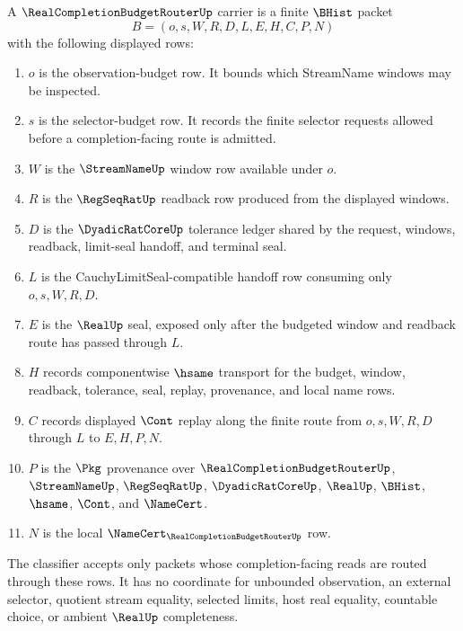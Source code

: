 \begin{definition}
\label{def:real-completion-budget-router-carrier}
A $\RealCompletionBudgetRouterUp$ carrier is a finite $\BHist$ packet
$$
B=(o,s,W,R,D,L,E,H,C,P,N)
$$
with the following displayed rows:
\begin{enumerate}
\item $o$ is the observation-budget row. It bounds which StreamName windows may be inspected.
\item $s$ is the selector-budget row. It records the finite selector requests allowed before a completion-facing route is admitted.
\item $W$ is the $\StreamNameUp$ window row available under $o$.
\item $R$ is the $\RegSeqRatUp$ readback row produced from the displayed windows.
\item $D$ is the $\DyadicRatCoreUp$ tolerance ledger shared by the request, windows, readback, limit-seal handoff, and terminal seal.
\item $L$ is the CauchyLimitSeal-compatible handoff row consuming only $o,s,W,R,D$.
\item $E$ is the $\RealUp$ seal, exposed only after the budgeted window and readback route has passed through $L$.
\item $H$ records componentwise $\hsame$ transport for the budget, window, readback, tolerance, seal, replay, provenance, and local name rows.
\item $C$ records displayed $\Cont$ replay along the finite route from $o,s,W,R,D$ through $L$ to $E,H,P,N$.
\item $P$ is the $\Pkg$ provenance over $\RealCompletionBudgetRouterUp$, $\StreamNameUp$, $\RegSeqRatUp$, $\DyadicRatCoreUp$, $\RealUp$, $\BHist$, $\hsame$, $\Cont$, and $\NameCert$.
\item $N$ is the local $\NameCert_{\RealCompletionBudgetRouterUp}$ row.
\end{enumerate}
The classifier accepts only packets whose completion-facing reads are routed through these rows. It has no coordinate for unbounded observation, an external selector, quotient stream equality, selected limits, host real equality, countable choice, or ambient $\RealUp$ completeness.
\end{definition}

